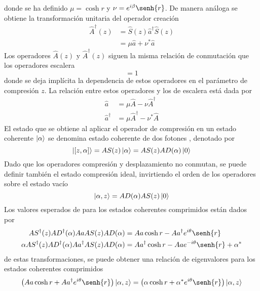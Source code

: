 donde se ha definido $\mu = \cosh{r}$ y $\nu = e^{i\beta}\senh{r}$. De manera análoga se obtiene la transformación unitaria del operador creación
\begin{align*}
  \hat{A}^{\dagger}(z) & = \hat{S}(z)\hat{a}^{\dagger} \hat{S}(z) \\
                       & = \mu\hat{a} + \nu^* \hat{a}
\end{align*}
Los operadores $\hat{A}(z)$ y $\hat{A}^\dagger(z)$ siguen la misma relación de conmutación que los operadores escalera
\begin{equation*}
  [\hat{A}, \hat{A}^{\dagger})] = 1
\end{equation*}
donde se deja implícita la dependencia de estos operadores en el parámetro de compresión $z$. La relación entre estos operadores y los de escalera está dada por
\begin{align*}
  \hat{a}           & = \mu \hat{A} - \nu \hat{A}^\dagger   \\
  \hat{a}^{\dagger} & = \mu \hat{A}^\dagger - \nu^* \hat{A}
\end{align*}
El estado que se obtiene al aplicar el operador de compresión en un estado coherente $\ket{\alpha}$ se denomina estado coherente de dos fotones \cite{Mandel}, denotado por
\begin{equation*}
  \ket{[z,\alpha]} = A{S}(z)\ket{\alpha} = A{S}(z)A{D}(\alpha)\ket{0}
\end{equation*}
Dado que los operadores compresión y desplazamiento no conmutan, se puede definir también el estado compresión ideal, invirtiendo el orden de los operadores sobre el estado vacío \cite{Loudon}
\begin{equation*}
  \ket{\alpha, z} = A{D}(\alpha) A{S}(z) \ket{0}
\end{equation*}
Los valores esperados de para los estados coherentes comprimidos están dados por
\begin{align*}
  \hat{S}^\dagger(z) \hat{D}^\dagger (\alpha) \hat{a} \hat{S}(z) \hat{D}(\alpha)           & = \hat{a} \cosh{r} - \hat{a}^{\dagger} e^{i\theta}\senh{r}             \\ \alpha
  \hat{S}^\dagger(z) \hat{D}^\dagger (\alpha) \hat{a}^{\dagger} \hat{S}(z) \hat{D}(\alpha) & = \hat{a}^{\dagger} \cosh{r} - \hat{a} e^{-i\theta}\senh{r} + \alpha^*
\end{align*}
de estas transformaciones, se puede obtener una relación de eigenvalores para los estados coherentes comprimidos
\begin{equation*}
  \left( \hat{a} \cosh{r} + \hat{a}^{\dagger} e^{i\theta} \senh{r} \right) \ket{\alpha, z} = \left( \alpha \cosh{r} + \alpha^* e^{i\theta} \senh{r} \right) \ket{\alpha, z}
\end{equation*}
